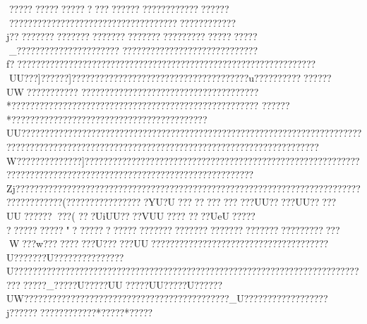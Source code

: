 {{{{{{{{{{{{{{{{{{{{{{{{{{{{{{{{{{{{{{{{{{{{{{{{{{{{{{{{{{{{{{{{{{{{{{{{{{{{{{{{{{{{{{{{{{{{{{{{{{{{{{{{{{{{{{{{{{{{{{{{{{{{{{{{{{{{{{{{{{{{{{{{{{{{{{{{{{{{{{{{{{{{{{{{{{{{{{{{{{{{{{{{{{{{{{{{{{{{{{{{{{{{{{{{{{{{{{{{{{{{{{{{{{{{{{{{{{{{{{{{{{{{{{{{{{{{{{{{{{{{{{{{{{{{{{{{{{{{{{{{{{{{{{{{{{{{{{{{{{{{{{{{{{{{{{{{{{{{{{{{{{{{{{{{{{{{{{{{{{{{{{{{{{{{{{{{{{{{{{{{{{{{{{{{{{{{{{{{{{{{{{{{{{{{{{{{{{{{{{{{{{{{{{{{{{{{{{{{{{{{{{{{{{{{{{{{{{{{{{{{{{{{{{{{{{{{{{{{{{{{{{{{{{{{{{{{{{{{{{{{{{{{{{{{{{{{{{{{{{{{{{{{{{{{{{{{{{{{{{{{{{{{{{{{{{{{{{{{{{{{{{{{{{{{{{{{{{{{{{{{{{{{{{{{{{{{{{{{{{{{{{{{{{{{{{{{{{{{{{{{{{{{{{{{{{{{{{{{{{{{{{{{{{{{{{{{{{{{{{{{{{{{{{{{{{{{{{{{{{{{{{{{{{{{{{{{{{{{{{{{{{{{{{{{{{{{{{{{{{{{{{{{{{{{{{{{{{{{{{{{{{{{{{{{{{{{{{{{{{{{{{{{{{{{{{{{{{{{{{{{{{{{{{{{{{{{{{{{{{{{{{{{{{{{{{{{{{ ?????  ?????  ?????  ????  ?????? ?????? ??????  ?????? ?????????????? ??????? ??????? ????????????????????j?????????????????????????????????????????????????_??????????????????????
?????????????????????????????f?????????????????????????????????????????????????????????????????UU???]??????]?????? ????? ????? ??????????????????????u????????????????UW?????  ??????    ?????   ?????   ??????  ??????? ?????   ??????????*????????????? ?????? ??????????????????????????????????
??????  *????   ????   ????   ????   ????  ?????   ????  ?????   ????   ????UU????? ????????????????????????????????? ??????????????????????????????????????????????????????????????????????????????????????????????????????W??????????????]????????????????????????????????????????????????????????????????????????????????????????????????????????????????Zj??????????????????????????????????????????????????????????????????????????????? ???????(??????? ??????? ???YU?U????? ??? ? ?????UU?????UU?????UU?????????(   ???UiUU????VUU????   ????UeU?????
??????  ?????"????????????????????????????????????????????????????W???w???????  ???U??????UU?????  ?????????????????????????????????U???????U???????????????U??????? ???????????????????????????????????????????????????????????????????????????_?????U?????UU?????UU?????U??????UW?????  ???????????????????????????????????????_U??????????????????j??????????????????*?????*?????
}}}}}}}}}}}}}}}}}}}}}}}}}}}}}}}}}}}}}}}}}}}}}}}}}}}}}}}}}}}}}}}}}}}}}}}}}}}}}}}}}}}}}}}}}}}}}}}}}}}}}}}}}}}}}}}}}}}}}}}}}}}}}}}}}}}}}}}}}}}}}}}}}}}}}}}}}}}}}}}}}}}}}}}}}}}}}}}}}}}}}}}}}}}}}}}}}}}}}}}}}}}}}}}}}}}}}}}}}}}}}}}}}}}}}}}}}}}}}}}}}}}}}}}}}}}}}}}}}}}}}}}}}}}}}}}}}}}}}}}}}}}}}}}}}}}}}}}}}}}}}}}}}}}}}}}}}}}}}}}}}}}}}}}}}}}}}}}}}}}}}}}}}}}}}}}}}}}}}}}}}}}}}}}}}}}}}}}}}}}}}}}}}}}}}}}}}}}}}}}}}}}}}}}}}}}}}}}}}}}}}}}}}}}}}}}}}}}}}}}}}}}}}}}}}}}}}}}}}}}}}}}}}}}}}}}}}}}}}}}}}}}}}}}}}}}}}}}}}}}}}}}}}}}}}}}}}}}}}}}}}}}}}}}}}}}}}}}}}}}}}}}}}}}}}}}}}}}}}}}}}}}}}}}}}}}}}}}}}}}}}}}}}}}}}}}}}}}}}}}}}}}}}}}}}}}}}}}}}}}}}}}}}}}}}}}}}}}}}}}}}}}}}}}}}}}}}}}}}}}}}}}}}}}}}}}}}}}}}}}}}}}}}}}}}}}}}}}}}}}}}}}}}}}}}}}}}}}}}}}}}}}}}}}}}}}}}}}}}}}}}}}}}}}}}}}}}}}}}}}}}}}}}}}}}}}}}}}}}}}}}}}}}}}}}}}}}}
